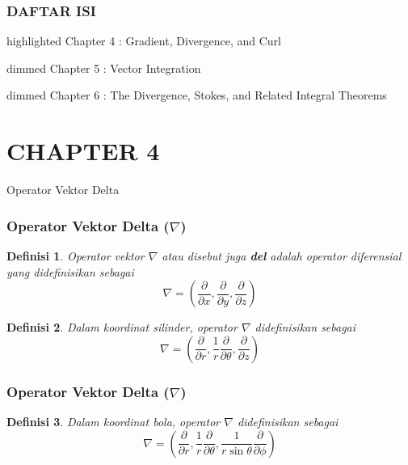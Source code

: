 \documentclass[10pt]{beamer}
\newtheorem{definisi}{Definisi}
\begin{document}
\begin{frame} 
\frametitle{DAFTAR ISI}
    \begin{beamercolorbox}
        [wd=\textwidth,rounded=true,shadow=true]{highlighted}
        Chapter 4 : Gradient, Divergence, and Curl
    \end{beamercolorbox} 
    \vspace{3ex}
    \begin{beamercolorbox}
        [wd=\textwidth,rounded=true,shadow=true]{dimmed}
        Chapter 5 : Vector Integration
    \end{beamercolorbox}
    \vspace{2ex}
    \begin{beamercolorbox}
        [wd=\textwidth,rounded=true,shadow=true]{dimmed}
        Chapter 6 : The Divergence, Stokes, and Related Integral Theorems
    \end{beamercolorbox}
    \vspace{2ex}   
\end{frame}

\section{CHAPTER 4}
\begin{frame}{Operator Vektor Delta}
    \frametitle{Operator Vektor Delta ($\nabla$)}
    \begin{definisi}
        Operator vektor $\nabla$ atau disebut juga \textbf{del} adalah operator diferensial yang didefinisikan sebagai
        \begin{equation}
            \nabla = \left(\frac{\partial}{\partial x}, \frac{\partial}{\partial y}, \frac{\partial}{\partial z}\right)
        \end{equation}
    \end{definisi}
    \begin{definisi}
        Dalam koordinat silinder, operator $\nabla$ didefinisikan sebagai
        \begin{equation}
            \nabla = \left(\frac{\partial}{\partial r}, \frac{1}{r}\frac{\partial}{\partial \theta}, \frac{\partial}{\partial z}\right)
        \end{equation}
    \end{definisi}
\end{frame}

\begin{frame}
    \frametitle{Operator Vektor Delta ($\nabla$)}
    \begin{definisi}
        Dalam koordinat bola, operator $\nabla$ didefinisikan sebagai
        \begin{equation}
            \nabla = \left(\frac{\partial}{\partial r}, \frac{1}{r}\frac{\partial}{\partial \theta}, \frac{1}{r\sin\theta}\frac{\partial}{\partial \phi}\right)
        \end{equation}
    \end{definisi}
\end{frame}
\end{document}

